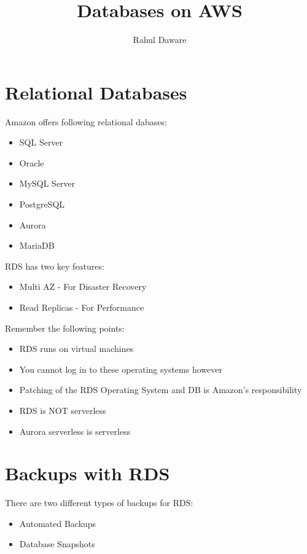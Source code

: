 \documentclass{article}
\author{Rahul Daware}
\begin{document}
\title{Databases on AWS}
\maketitle
\newpage
\tableofcontents
\newpage

\section{Relational Databases}
Amazon offers following relational dabases:

\begin{itemize}
\item
SQL Server

\item
Oracle

\item
MySQL Server

\item
PostgreSQL

\item
Aurora

\item
MariaDB
\end{itemize}

RDS has two key features:
\begin{itemize}
\item
Multi AZ - For Disaster Recovery

\item
Read Replicas - For Performance
\end{itemize}

Remember the following points:
\begin{itemize}
\item
RDS runs on virtual machines

\item
You cannot log in to these operating systems however

\item
Patching of the RDS Operating System and DB is Amazon's responsibility

\item
RDS is NOT serverless

\item
Aurora serverless is serverless

\end{itemize}

\section{Backups with RDS}
There are two different types of backups for RDS:
\begin{itemize}
\item
Automated Backups

\item
Database Snapshots
\end{itemize}
\end{document}
